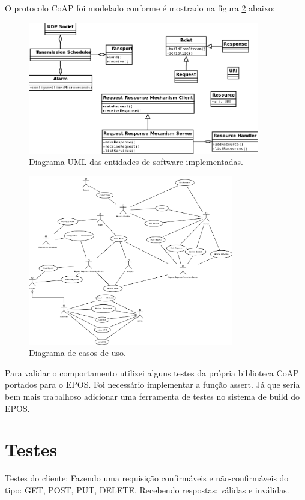 O protocolo CoAP foi modelado conforme \'e mostrado na figura \ref{uml} abaixo:
\begin{figure}[h]
   \label{uml}
   \centering
   \includegraphics[width=0.9\textwidth]{figuras/uml.png}
   \caption{Diagrama UML das entidades de software implementadas.}
\end{figure}


\begin{figure}[h]
   \label{uml}
   \centering
   \includegraphics[width=0.8\textwidth]{figuras/casodeuso.png}
   \caption{Diagrama de casos de uso.}
\end{figure}

Para validar o comportamento utilizei alguns testes da pr\'opria biblioteca CoAP portados para o EPOS. Foi necess\'ario implementar a fun\c{c}\~ao assert. J\'a que seria bem mais trabalhoso adicionar uma ferramenta de testes no sistema de build do EPOS.

\section{Testes}
Testes do cliente:
Fazendo uma requisi\c{c}\~ao confirm\'aveis e n\~ao-confirm\'aveis do tipo: GET, POST, PUT, DELETE.
Recebendo respostas: válidas e inválidas.


